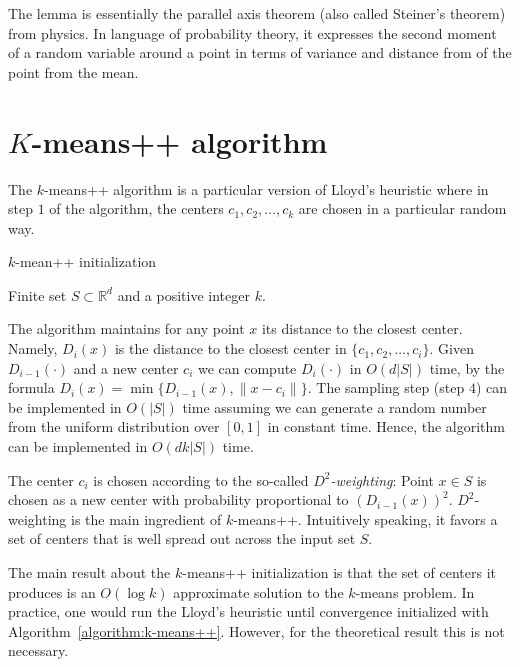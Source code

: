 \documentclass[9pt]{article}
\newcommand{\R}{\mathbb{R}}
\newcommand{\norm}[1]{\|{#1}\|}
\begin{document}
The lemma is essentially the parallel axis theorem (also called Steiner's
theorem) from physics. In language of probability theory, it expresses the
second moment of a random variable around a point in terms of variance and
distance from of the point from the mean.

\section{$K$-means++ algorithm}

The $k$-means++ algorithm is a particular version of Lloyd's heuristic where in
step $1$ of the algorithm, the centers $c_1, c_2, \dots, c_k$ are chosen
in a particular random way.

\begin{algorithm}[h]
\caption{$k$-mean++ initialization \label{algorithm:k-means++}}
\begin{algorithmic}[1]
{
\REQUIRE Finite set $S \subset \R^d$ and a positive integer $k$.
\STATE{For any $x \in S$ define $D_{i-1}(x) = \min_{1 \le j \le i-1} \norm{x - c_j}$}
\ENDFOR
{}
}
\end{algorithmic}
\end{algorithm}

The algorithm maintains for any point $x$ its distance to the closest center.
Namely, $D_i(x)$ is the distance to the closest center in $\{c_1, c_2, \dots,
c_i\}$. Given $D_{i-1}(\cdot)$ and a new center $c_i$ we can compute $D_i(\cdot)$ in $O(d|S|)$
time, by the formula $D_i(x) = \min\{D_{i-1}(x), \norm{x - c_i}\}$.
The sampling step (step $4$) can be implemented in $O(|S|)$
time assuming we can generate a random number from the uniform distribution
over $[0,1]$ in constant time. Hence, the algorithm can be implemented in
$O(dk|S|)$ time.

The center $c_i$ is chosen according to the so-called \emph{$D^2$-weighting}:
Point $x \in S$ is chosen as a new center with probability proportional to
$(D_{i-1}(x))^2$. $D^2$-weighting is the main ingredient of $k$-means++.
Intuitively speaking, it favors a set of centers that is well spread out across
the input set $S$.

The main result about the $k$-means++ initialization is that the set of centers
it produces is an $O(\log k)$ approximate solution to the $k$-means problem. In
practice, one would run the Lloyd's heuristic until convergence initialized
with Algorithm~\ref{algorithm:k-means++}.  However, for the theoretical result
this is not necessary.
\end{document}
